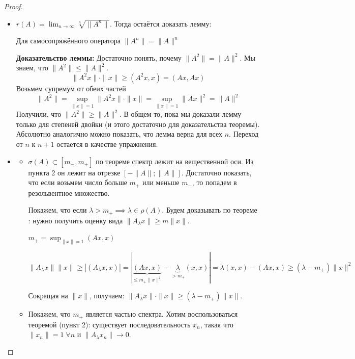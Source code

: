 \begin{proof}
\begin{itemize}
      \item[2.] $r(A)=\lim_{n \to \infty} \sqrt[n]{\|A^n\|}$. Тогда остаётся доказать лемму:
        \begin{lemma}
        Для самосопряжённого оператора $\|A^n\| = \|A\|^n$
        \end{lemma}
        \textbf{Доказательство леммы:} Достаточно понять, почему $\|A^2\| = \|A\|^2$. Мы знаем, что $\|A^2\| \leqslant \|A\|^2$.
        \[
            \|A^2 x\| \cdot \|x\| \geqslant (A^2 x, x) = (Ax, Ax)
        \]
        Возьмем супремум от обеих частей
        \[
            \|A^2\| = \sup_{\|x\|=1} \|A^2 x\| \cdot \| x \| = \sup_{\|x\|=1} \|Ax\|^2=\|A\|^2
        \]
        Получили, что $\|A^2\| \geqslant \|A\|^2$.
        В общем-то, пока мы доказали лемму только для степеней двойки (и этого достаточно для доказательства теоремы).
        Абсолютно аналогично можно показать, что лемма верна для всех $n$.
        Переход от $n$ к $n+1$ остается в качестве упражнения.

        \item[1.] 
        \begin{itemize}
            \item[a)] $\sigma(A) \subset [m_-, m_+]$
            по теореме  спектр лежит на вещественной оси. Из пункта 2 он лежит на отрезке $[-\|A\|; \|A\|]$. 
            Достаточно показать, что если возьмем число больше $m_+$ или меньше $m_-$, то попадем в резольвентное множество.

            Покажем, что если $\lambda > m_+ \implies \lambda \in \rho(A)$. Будем доказывать по теореме :
            нужно получить оценку вида $\|A_{\lambda} x\| \geqslant m \|x\|$.

            $m_+ = \sup_{\|x\| = 1} (Ax, x)$

            \[
            \|A_\lambda x \| \|x\| \geqslant |(A_{\lambda} x, x)| = |\underbrace{(A x, x)}_{\leqslant m_+ \|x\|^2} - \underbrace{\lambda}_{> m_+} (x, x)| = 
            \lambda (x, x) - (A x, x) \geqslant (\lambda - m_+) \|x\|^2
            \]

            Сокращая на $\|x\|$, получаем:
            $\|A_{\lambda} x\| \cdot \|x\| \geqslant (\lambda - m_+) \|x\|$.
            \item[b)] Покажем, что $m_{+}$ является частью спектра. Хотим воспользоваться теоремой  (пункт 2): существует последовательность $x_n$, такая что $\|x_n\| = 1 \; \forall n$ и $\|A_{\lambda} x_n\| \to 0$.


\end{itemize}
\end{itemize}
\end{proof}
